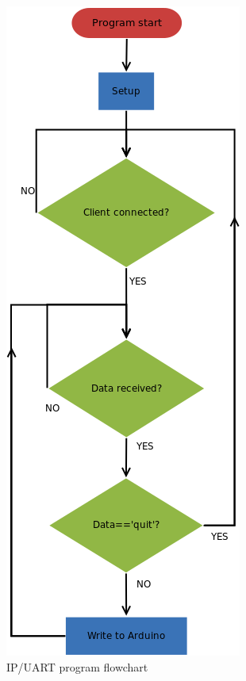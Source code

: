 \begin{figure}[H]
      \centering
      \includegraphics[scale=.8]{images/Diagrams/rasbpi.png}
      \caption{IP/UART program flowchart }
      \label{rasbpiFlowchart}
  \end{figure}
  \bigskip



